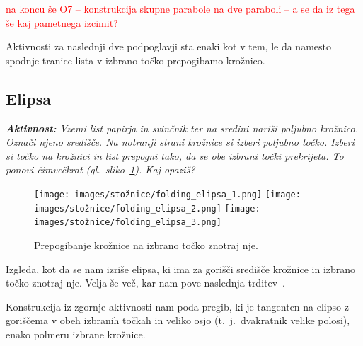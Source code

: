 \textcolor{red}{na koncu še O7 -- konstrukcija skupne parabole na dve paraboli -- a se da iz tega še kaj pametnega izcimit?}

Aktivnosti za naslednji dve podpoglavji sta enaki kot v tem, le da namesto spodnje tranice lista v izbrano točko prepogibamo krožnico.

\subsection{Elipsa}

\textit{\textbf{Aktivnost:} Vzemi list papirja in svinčnik ter na sredini nariši poljubno krožnico. Označi njeno središče. Na notranji strani krožnice si izberi poljubno točko. Izberi si točko na krožnici in list prepogni tako, da se obe izbrani točki prekrijeta. To ponovi čimvečkrat (gl.\ sliko~\ref{fig:koraki_elipsa}). Kaj opaziš?}

\begin{figure}[h]
    \centering
    \texttt{[image: images/stožnice/folding\_elipsa\_1.png]}
    \texttt{[image: images/stožnice/folding\_elipsa\_2.png]}
    \texttt{[image: images/stožnice/folding\_elipsa\_3.png]}
    \caption[Prepogibanje elipse]{Prepogibanje krožnice na izbrano točko znotraj nje.}
    \label{fig:koraki_elipsa}
\end{figure}


Izgleda, kot da se nam izriše elipsa, ki ima za gorišči središče krožnice in izbrano točko znotraj nje. Velja še več, kar nam pove naslednja trditev~\cite[str.\ 60--61]{hull2013}.

\begin{trditev}
    Konstrukcija iz zgornje aktivnosti nam poda pregib, ki je tangenten na elipso z goriščema v obeh izbranih točkah in veliko osjo (t.\ j.\ dvakratnik velike polosi), enako polmeru izbrane krožnice.
\end{trditev}

